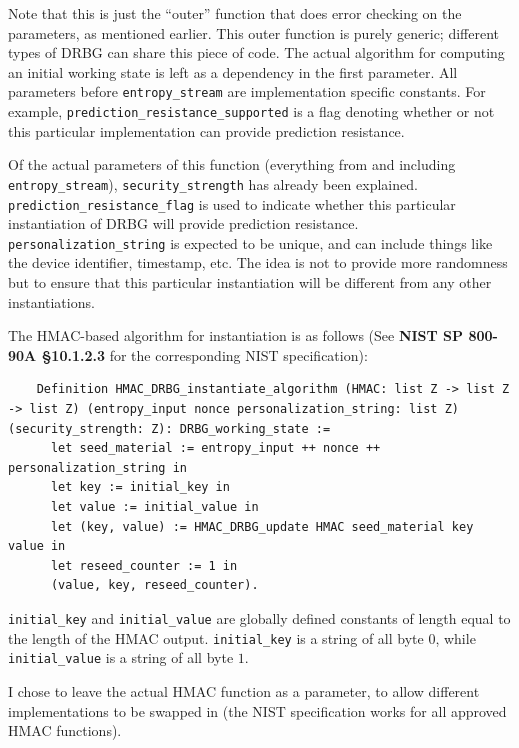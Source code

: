 \documentclass[pageno]{jpaper}
\newcommand{\stdtitle}[1]{\textbf{#1}}
\begin{document}
Note that this is just the “outer” function that does error checking on the parameters, as mentioned earlier. This outer function is purely generic; different types of DRBG can share this piece of code. The actual algorithm for computing an initial working state is left as a dependency in the first parameter. All parameters before \lstinline{entropy_stream} are implementation specific constants. For example, \lstinline{prediction_resistance_supported} is a flag denoting whether or not this particular implementation can provide prediction resistance.

Of the actual parameters of this function (everything from and including \lstinline{entropy_stream}), \lstinline{security_strength} has already been explained. \lstinline{prediction_resistance_flag} is used to indicate whether this particular instantiation of DRBG will provide prediction resistance.\\ \lstinline{personalization_string} is expected to be unique, and can include things like the device identifier, timestamp, etc. The idea is not to provide more randomness but to ensure that this particular instantiation will be different from any other instantiations.

The HMAC-based algorithm for instantiation is as follows (See \stdtitle{NIST SP 800-90A \S 10.1.2.3} for the corresponding NIST specification):

\begin{lstlisting}
    Definition HMAC_DRBG_instantiate_algorithm (HMAC: list Z -> list Z -> list Z) (entropy_input nonce personalization_string: list Z) (security_strength: Z): DRBG_working_state :=
      let seed_material := entropy_input ++ nonce ++ personalization_string in
      let key := initial_key in
      let value := initial_value in
      let (key, value) := HMAC_DRBG_update HMAC seed_material key value in
      let reseed_counter := 1 in
      (value, key, reseed_counter).
\end{lstlisting}


\lstinline{initial_key} and \lstinline{initial_value} are globally defined constants of length equal to the length of the HMAC output. \lstinline{initial_key} is a string of all byte $0$, while \lstinline{initial_value} is a string of all byte $1$.

I chose to leave the actual HMAC function as a parameter, to allow different implementations to be swapped in (the NIST specification works for all approved HMAC functions).
\end{document}
